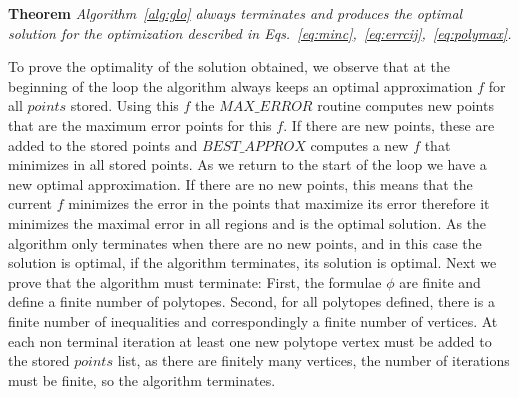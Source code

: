 {\bf Theorem} {\it Algorithm~\ref{alg:glo} always terminates and produces the optimal solution for the optimization described in Eqs.~\ref{eq:minc},~\ref{eq:errcij},~\ref{eq:polymax}.} 

To prove the optimality of the solution obtained, we observe that at the beginning of the loop the algorithm always keeps an optimal approximation $f$ for all $points$ stored. Using this $f$ the $MAX\_ERROR$ routine computes new points that are the maximum error points for this $f$. If there are new points, these are added to the stored points and $BEST\_APPROX$ computes a new $f$ that minimizes in all stored points. As we return to the start of the loop we have a new optimal approximation. If there are no new points, this means that the current $f$ minimizes the error in the points that maximize its error therefore it minimizes the maximal error in all regions and is the optimal solution.  As the algorithm only terminates when there are no new points, and in this case the solution is optimal, if the algorithm terminates, its solution is optimal.
 Next we prove that the algorithm must terminate: First, the formulae $\phi$  are finite and define a finite number of polytopes. Second, for all polytopes defined, there is a finite number of inequalities and correspondingly a finite number of vertices. At each non terminal iteration at least one new polytope vertex must be added to the stored $points$ list, as there are finitely many vertices, the number of iterations must be finite, so the algorithm terminates.





